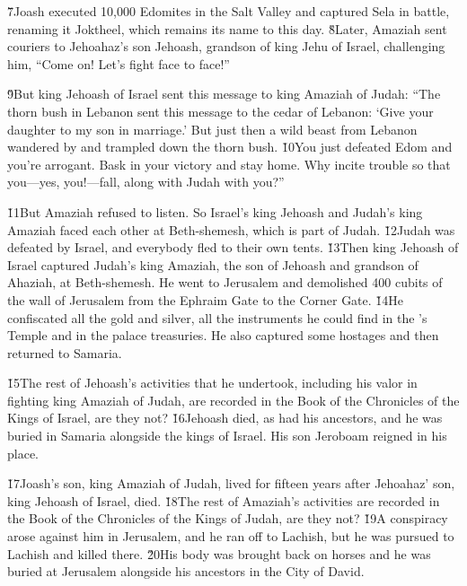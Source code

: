 \v{7}Joash executed 10,000 Edomites in the Salt Valley and captured Sela in battle, renaming it Joktheel, which remains its name to this day. \v{8}Later, Amaziah sent couriers to Jehoahaz's son Jehoash, grandson of king Jehu of Israel, challenging him, ``Come on! Let's fight face to face!''

\v{9}But king Jehoash of Israel sent this message to king Amaziah of Judah: ``The thorn bush in Lebanon sent this message to the cedar of Lebanon: `Give your daughter to my son in marriage.' But just then a wild beast from Lebanon wandered by and trampled down the thorn bush. \v{10}You just defeated Edom and you're arrogant. Bask in your victory and stay home. Why incite trouble so that you---yes, you!---fall, along with Judah with you?''

\v{11}But Amaziah refused to listen. So Israel's king Jehoash and Judah's king Amaziah faced each other at Beth-shemesh, which is part of Judah. \v{12}Judah was defeated by Israel, and everybody fled to their own tents. \v{13}Then king Jehoash of Israel captured Judah's king Amaziah, the son of Jehoash and grandson of Ahaziah, at Beth-shemesh. He went to Jerusalem and demolished 400 cubits of the wall of Jerusalem from the Ephraim Gate to the Corner Gate. \v{14}He confiscated all the gold and silver, all the instruments he could find in the 's Temple and in the palace treasuries. He also captured some hostages and then returned to Samaria.

\v{15}The rest of Jehoash's activities that he undertook, including his valor in fighting king Amaziah of Judah, are recorded in the Book of the Chronicles of the Kings of Israel, are they not? \v{16}Jehoash died, as had his ancestors, and he was buried in Samaria alongside the kings of Israel. His son Jeroboam reigned in his place.

\v{17}Joash's son, king Amaziah of Judah, lived for fifteen years after Jehoahaz' son, king Jehoash of Israel, died. \v{18}The rest of Amaziah's activities are recorded in the Book of the Chronicles of the Kings of Judah, are they not? \v{19}A conspiracy arose against him in Jerusalem, and he ran off to Lachish, but he was pursued to Lachish and killed there. \v{20}His body was brought back on horses and he was buried at Jerusalem alongside his ancestors in the City of David.

